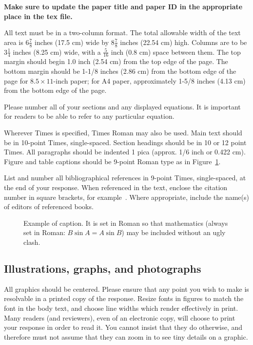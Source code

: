 \documentclass[10pt,twocolumn,letterpaper]{article}
\begin{document}
{\bf Make sure to update the paper title and paper ID in the appropriate place in the tex file.}

All text must be in a two-column format. The total allowable width of the text
area is $6\frac78$ inches (17.5 cm) wide by $8\frac78$ inches (22.54 cm) high.
Columns are to be $3\frac14$ inches (8.25 cm) wide, with a $\frac{5}{16}$ inch
(0.8 cm) space between them. The top margin should begin
1.0 inch (2.54 cm) from the top edge of the page.  The bottom margin should be
1-1/8 inches (2.86 cm) from the bottom edge of the page for $8.5 \times
11$-inch paper; for A4 paper, approximately 1-5/8 inches (4.13 cm) from the
bottom edge of the page.

Please number all of your sections and any displayed equations.  It is important
for readers to be able to refer to any particular equation.

Wherever Times is specified, Times Roman may also be used.  Main text should be
in 10-point Times, single-spaced. Section headings should be in 10 or 12 point
Times.  All paragraphs should be indented 1 pica (approx. 1/6 inch or 0.422
cm).  Figure and table captions should be 9-point Roman type as in
Figure~\ref{fig:onecol}.


List and number all bibliographical references in 9-point Times, single-spaced,
at the end of your response. When referenced in the text, enclose the citation
number in square brackets, for example~\cite{Alpher02}.  Where appropriate,
include the name(s) of editors of referenced books.

\begin{figure}[t]
\begin{center}
\fbox{\rule{0pt}{1in} \rule{0.9\linewidth}{0pt}}
\end{center}
   \caption{Example of caption.  It is set in Roman so that mathematics
   (always set in Roman: $B \sin A = A \sin B$) may be included without an
   ugly clash.}
\label{fig:long}
\label{fig:onecol}
\end{figure}


\subsection{Illustrations, graphs, and photographs}

All graphics should be centered.  Please ensure that any point you wish to make is resolvable in a printed copy of the response.  Resize fonts in figures to match the font in the body text, and choose line widths which render effectively in print.  Many readers (and reviewers), even of an electronic copy, will choose to print your response in order to read it.  You cannot insist that they do otherwise, and therefore must not assume that they can zoom in to see tiny details on a graphic.
\end{document}

